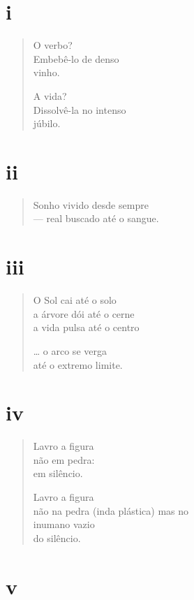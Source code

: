 \section{i}

\begin{verse}
O verbo?\\
Embebê-lo de denso\\
\hfill vinho.

A vida?\\
Dissolvê-la no intenso\\
\hfill júbilo.
\end{verse}

\medskip
\section{ii}

\begin{verse}
Sonho vivido desde sempre\\
--- real buscado até o sangue.
\end{verse}

\medskip
\section{iii}

\begin{verse}
O Sol cai até o solo\\
a árvore dói até o cerne\\
a vida pulsa até o centro

\ldots{} o arco se verga\\
até o extremo limite.
\end{verse}

\medskip
\section{iv}

\begin{verse}
Lavro a figura\\
não em pedra:\\
\hfill em silêncio.

Lavro a figura\\
não na pedra (inda plástica) mas no\\
inumano vazio\\
do silêncio.
\end{verse}

\medskip
\section{v}


